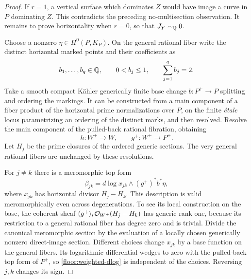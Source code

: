 \begin{proof}
If $r=1$, a vertical surface which dominates $Z$ would have image
a curve in $P$ dominating $Z$.  This contradicts the preceding
no-multisection observation.  It remains to prove horizontality
when $r=0$, so that $J_Y\sim_{\mathbb{Q}}0$.

Choose a nonzero $\eta\in H^0(P,K_P)$.  On the general rational
fiber write the distinct horizontal marked points and their
coefficients as
\[
 b_1,\ldots,b_q\in\mathbb{Q},\qquad
 0<b_j\le1,\qquad \sum_{j=1}^q b_j=2.
\]
Take a smooth compact K\"ahler generically finite base change
$b:P^+\to P$ splitting and ordering the markings.  It can be
constructed from a main component of a fiber product of the
horizontal prime normalizations over $P$, on the finite \emph{\'etale}
locus parametrizing an ordering of the distinct marks, and then
resolved.  Resolve the main component of the pulled-back rational
fibration, obtaining
\[
 h:W^+\longrightarrow W,\qquad
 g^+:W^+\longrightarrow P^+.
\]
Let $H_j$ be the prime closures of the ordered generic sections.
The very general rational fibers are unchanged by these resolutions.

For $j\ne k$ there is a meromorphic top form
\begin{equation}
 \label{floor:weighted-dlog}
 \beta_{jk}=d\log x_{jk}\wedge(g^+)^*b^*\eta,
\end{equation}
where $x_{jk}$ has horizontal divisor $H_j-H_k$.  This description
is valid meromorphically even across degenerations.  To see its
local construction on the base, the coherent sheaf
$(g^+)_*\mathcal{O}_{W^+}(H_j-H_k)$ has generic rank one, because its
restriction to a general rational fiber has degree zero and is
trivial.  Divide the canonical meromorphic section by the
evaluation of a locally chosen generically nonzero direct-image
section.  Different choices change $x_{jk}$ by a base function on
the general fibers.  Its logarithmic differential wedges to zero
with the pulled-back top form of $P^+$, so
\eqref{floor:weighted-dlog} is independent of the choices.
Reversing $j,k$ changes its sign.


\end{proof}

